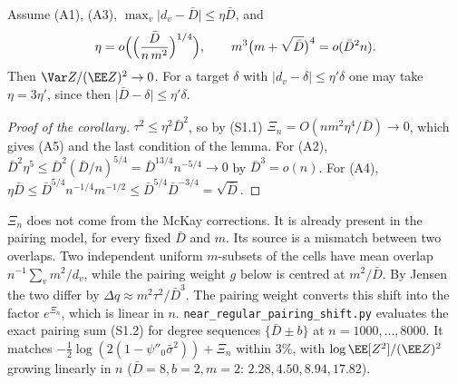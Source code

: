 \begin{corollary}
\label{cor:near-regular-eta}
Assume (A1), (A3), \(\max_v\lvert d_v-\bar D\rvert\le\eta\bar D\), and
\[
\eta=o\Bigl(\Bigl(\frac{\bar D}{n\,m^2}\Bigr)^{1/4}\Bigr),
\qquad
m^3\bigl(m+\sqrt{\bar D}\bigr)^4=o(\bar D^2n).
\]
Then \(\Var Z/(\EE Z)^2\to0\). For a target \(\delta\) with
\(\lvert d_v-\delta\rvert\le\eta'\delta\) one may take \(\eta=3\eta'\), since then
\(\lvert\bar D-\delta\rvert\le\eta'\delta\).
\end{corollary}

\begin{proof}[Proof of the corollary]
\(\tau^2\le\eta^2\bar D^2\), so by (S1.1)
\(\Xi_n=O(nm^2\eta^4/\bar D)\to0\), which gives (A5) and the last condition of the lemma.
For (A2), \(\bar D^2\eta^5\le\bar D^2(\bar D/n)^{5/4}=\bar D^{13/4}n^{-5/4}\to0\) by
\(\bar D^3=o(n)\). For (A4),
\(\eta\bar D\le\bar D^{5/4}n^{-1/4}m^{-1/2}\le\bar D^{5/4}\bar D^{-3/4}=\sqrt{\bar D}\).
\end{proof}

\begin{remark}
\label{rem:near-regular-xi}
\(\Xi_n\) does not come from the McKay corrections. It is already present in the pairing model, for every fixed
\(\bar D\) and \(m\). Its source is a mismatch between two overlaps. Two independent uniform \(m\)-subsets of the cells have mean overlap
\(n^{-1}\sum_vm^2/d_v\), while the pairing weight \(g\) below is centred at
\(m^2/\bar D\). By Jensen the two differ by \(\Delta q\approx m^2\tau^2/\bar D^3\).
The pairing weight converts this shift into the factor \(e^{\Xi_n}\), which is linear in \(n\).
\texttt{near\_regular\_pairing\_shift.py} evaluates the exact pairing sum
(S1.2) for degree sequences \(\{\bar D\pm b\}\) at \(n=1000,\dots,8000\). It
matches \(-\tfrac12\log(2(1-\psi''_0\bar\sigma^2))+\Xi_n\) within \(3\%\), with
\(\log\EE[Z^2]/(\EE Z)^2\) growing linearly in \(n\)
(\(\bar D=8,b=2,m=2\): \(2.28,4.50,8.94,17.82\)).
\end{remark}

